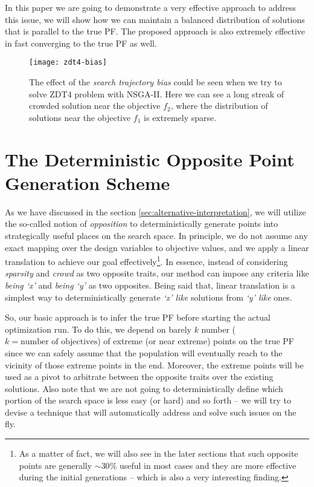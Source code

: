 \documentclass[journal]{IEEEtran}
\let\MYoriglatexcaption\caption
\renewcommand{\caption}[2][\relax]{\MYoriglatexcaption[#2]{#2}}
\begin{document}
In this paper we are going to demonstrate a very effective approach to address this issue, we will show how we can maintain a balanced distribution of solutions that is parallel to the true PF. The proposed approach is also extremely effective in fast converging to the true PF as well.   
\begin{figure}[tp]
\centering
\texttt{[image: zdt4-bias]}
\caption{The effect of the \textit{search trajectory bias} could be seen when we try to solve ZDT4 problem with NSGA-II. Here we can see a long streak of crowded solution near the objective \(f_2\), where the distribution of solutions near the objective \(f_1\) is extremely sparse.}
\label{fig:zdt4-unbalanced-snapshot}
\end{figure}

\section{The Deterministic Opposite Point Generation Scheme}
\label{sec:generation-scheme}
As we have discussed in the section \ref{sec:alternative-interpretation}, we will utilize the so-called notion of \textit{opposition} to deterministically generate points into strategically useful places on the search space. In principle, we do not assume any exact mapping over the design variables to objective values, and we apply a linear translation to achieve our goal effectively\footnote{As a matter of fact, we will also see in the later sections that such opposite points are generally \(\sim 30\%\) useful in most cases and they are more effective during the initial generations -- which is also a very interesting finding.}. In essence, instead of considering \textit{sparsity} and \textit{crowd} as two opposite traits, our method can impose any criteria like \textit{being `x'} and \textit{being `y'} as two opposites. Being said that, linear translation is a simplest way to deterministically generate \textit{`x' like} solutions from \textit{`y' like} ones. 

So, our basic approach is to infer the true PF before starting the actual optimization run. To do this, we depend on barely \(k\) number (\(k = \text{number of objectives}\)) of extreme (or near extreme) points on the true PF since we can safely assume that the population will eventually reach to the vicinity of those extreme points in the end. Moreover, the extreme points will be used as a pivot to arbitrate between the opposite traits over the existing solutions. Also note that we are not going to deterministically define which portion of the search space is less easy (or hard) and so forth -- we will try to devise a technique that will automatically address and solve such issues on the fly.
\end{document}
